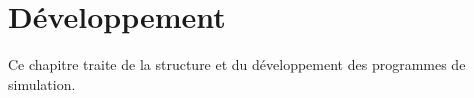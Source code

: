\chapter{Développement}

Ce chapitre traite de la structure et du développement des programmes de simulation.






